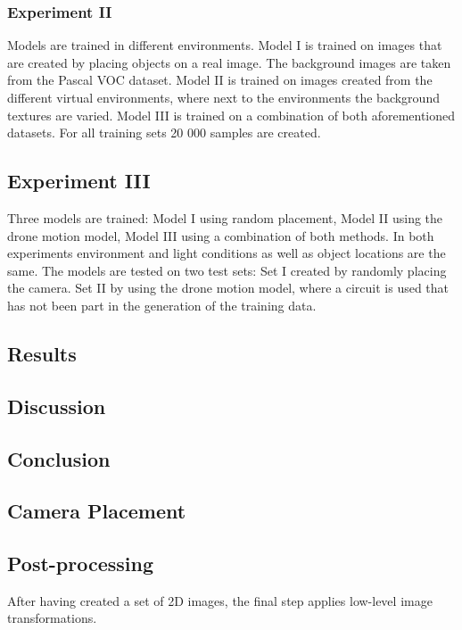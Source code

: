 \subsubsection{Experiment II}

Models are trained in different environments. Model I is trained on images that are created by placing objects on a real image. The background images are taken from the Pascal VOC dataset. Model II is trained on images created from the different virtual environments, where next to the environments the background textures are varied. Model III is trained on a combination of both aforementioned datasets. For all training sets 20 000 samples are created.

\subsection{Experiment III}

Three models are trained: Model I using random placement, Model II using the drone motion model, Model III using a combination of both methods. In both experiments environment and light conditions as well as object locations are the same. The models are tested on two test sets: Set I created by randomly placing the camera. Set II by using the drone motion model, where a circuit is used that has not been part in the generation of the training data.

\subsection{Results}


\subsection{Discussion}

\subsection{Conclusion}

\subsection{Camera Placement}


\subsection{Post-processing}

After having created a set of 2D images, the final step applies low-level image transformations.

